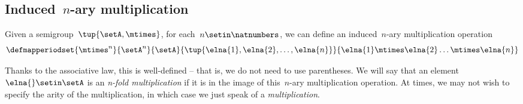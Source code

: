 \subsection{Induced~$n$-ary multiplication}
Given a semigroup~$\tup{\setA, \mtimes}$, for each~$n \setin \natnumbers$, we can define an induced~$n$-ary multiplication operation
% 
\begin{equation*}
    \defmapperiodset{\mtimes^n}{\setA^n}{\setA}{\tup{\elna{1}, \elna{2}, \ldots, \elna{n}}}{ \elna{1} \mtimes \elna{2} \ldots \mtimes \elna{n}}
\end{equation*}


Thanks to the associative law, this is well-defined -- that is, we do not need to use parentheses.
We will say that an element~$\elna{} \setin \setA$ is an \emph{n-fold multiplication} if it is in the image of this~$n$-ary multiplication operation.
At times, we may not wish to specify the arity of the multiplication, in which case we just speak of a \emph{multiplication}.

\showslides{
    \begin{forslides}
        \begin{equation}
            \label{eq:sg-mora}
            \mora
        \end{equation}
        \begin{equation}
            \label{eq:sg-morb}
            \morb
        \end{equation}
        \begin{equation}
            \label{eq:sg-morab}
            \mora\then\morb
        \end{equation}
    \end{forslides}
}
